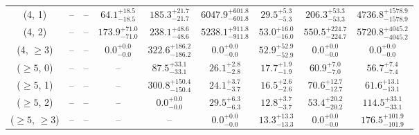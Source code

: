 \begin{table}[h!]
{\begin{tabular}{ccccccccc}
	(4, 1) & -- & -- & $64.1^{+ 18.5 }_{- 18.5 }$ & $185.3^{+ 21.7 }_{- 21.7 }$ & $6047.9^{+ 601.8 }_{- 601.8 }$ & $29.5^{+ 5.3 }_{- 5.3 }$ & $206.3^{+ 53.3 }_{- 53.3 }$ & $4736.8^{+ 1578.9 }_{- 1578.9 }$ \\[0.5ex] 
	(4, 2) & -- & -- & $173.9^{+ 71.0 }_{- 71.0 }$ & $238.1^{+ 48.6 }_{- 48.6 }$ & $5238.1^{+ 911.8 }_{- 911.8 }$ & $53.0^{+ 16.0 }_{- 16.0 }$ & $550.5^{+ 224.7 }_{- 224.7 }$ & $5720.8^{+ 4045.2 }_{- 4045.2 }$ \\[0.5ex] 
	(4, $\ge3$) & -- & -- & $0.0^{+ 0.0 }_{- 0.0 }$ & $322.6^{+ 186.2 }_{- 186.2 }$ & $0.0^{+ 0.0 }_{- 0.0 }$ & $52.9^{+ 52.9 }_{- 52.9 }$ & $0.0^{+ 0.0 }_{- 0.0 }$ & $0.0^{+ 0.0 }_{- 0.0 }$ \\[0.5ex] 
	($\ge5$, 0) & -- & -- & -- & $87.5^{+ 33.1 }_{- 33.1 }$ & $26.1^{+ 2.8 }_{- 2.8 }$ & $17.7^{+ 1.9 }_{- 1.9 }$ & $60.9^{+ 7.0 }_{- 7.0 }$ & $56.7^{+ 7.4 }_{- 7.4 }$ \\[0.5ex] 
	($\ge5$, 1) & -- & -- & -- & $300.8^{+ 150.4 }_{- 150.4 }$ & $24.1^{+ 3.7 }_{- 3.7 }$ & $16.5^{+ 2.6 }_{- 2.6 }$ & $70.6^{+ 12.7 }_{- 12.7 }$ & $61.6^{+ 13.1 }_{- 13.1 }$ \\[0.5ex] 
	($\ge5$, 2) & -- & -- & -- & $0.0^{+ 0.0 }_{- 0.0 }$ & $29.5^{+ 6.3 }_{- 6.3 }$ & $12.8^{+ 3.7 }_{- 3.7 }$ & $53.4^{+ 20.2 }_{- 20.2 }$ & $114.5^{+ 33.1 }_{- 33.1 }$ \\[0.5ex] 
	($\ge5$, $\ge3$) & -- & -- & -- & -- & $0.0^{+ 0.0 }_{- 0.0 }$ & $13.3^{+ 13.3 }_{- 13.3 }$ & $0.0^{+ 0.0 }_{- 0.0 }$ & $176.5^{+ 101.9 }_{- 101.9 }$ \\[0.5ex] 
	\hline
	\hline
\end{tabular}}
\end{table}
